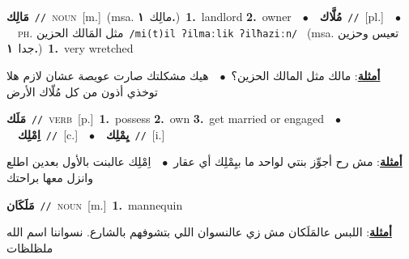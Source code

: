 \documentclass[10pt,a4paper,twoside]{article} %
\begin{document}
\begin{multicols}{2}
{\setlength\topsep{0pt}\textbf{\foreignlanguage{arabic}{مَالِك}}\ {\color{gray}\texttt{//}\color{black}}\ \textsc{noun}\ [m.]\ \color{gray}(msa. \foreignlanguage{arabic}{مالِك}~\foreignlanguage{arabic}{\textbf{١.}})\color{black}\ \textbf{1.}~landlord  \textbf{2.}~owner\ \ $\bullet$\ \ \setlength\topsep{0pt}\textbf{\foreignlanguage{arabic}{مُلَّاك}}\ {\color{gray}\texttt{//}\color{black}}\ [pl.]\ \ $\bullet$\ \ \textsc{ph.} \color{gray} \foreignlanguage{arabic}{مثل المَالك الحزين}\color{black}\ {\color{gray}\texttt{/{\sffamily mi(t)il ʔilmaːlik ʔilħaziːn}/}\color{black}}\ \color{gray} (msa. \foreignlanguage{arabic}{تعيس وحزين جدا}~\foreignlanguage{arabic}{\textbf{١.}})\color{black}\ \textbf{1.}~very wretched\  \begin{flushright}\color{gray}\foreignlanguage{arabic}{\textbf{\underline{\foreignlanguage{arabic}{أمثلة}}}: مالك مثل المالك الحزين؟\ $\bullet$\ \  هيك مشكلتك صارت عويصة عشان لازم هلا توخذي أذون من كل مُلّاك الأرض}\end{flushright}\color{black}} \vspace{2mm}

{\setlength\topsep{0pt}\textbf{\foreignlanguage{arabic}{مَلَك}}\ {\color{gray}\texttt{//}\color{black}}\ \textsc{verb}\ [p.]\ \textbf{1.}~possess  \textbf{2.}~own  \textbf{3.}~get married or engaged\ \ $\bullet$\ \ \setlength\topsep{0pt}\textbf{\foreignlanguage{arabic}{اِمْلِك}}\ {\color{gray}\texttt{//}\color{black}}\ [c.]\ \ $\bullet$\ \ \setlength\topsep{0pt}\textbf{\foreignlanguage{arabic}{يِمْلِك}}\ {\color{gray}\texttt{//}\color{black}}\ [i.]\  \begin{flushright}\color{gray}\foreignlanguage{arabic}{\textbf{\underline{\foreignlanguage{arabic}{أمثلة}}}: مش رح أجوِّز بنتي لواحد ما بيِمْلِك أي عقار\ $\bullet$\ \  اِمْلِك عالبنت بالأول بعدين اطلع وانزل معها براحتك}\end{flushright}\color{black}} \vspace{2mm}

{\setlength\topsep{0pt}\textbf{\foreignlanguage{arabic}{مَلَكَان}}\ {\color{gray}\texttt{//}\color{black}}\ \textsc{noun}\ [m.]\ \textbf{1.}~mannequin\  \begin{flushright}\color{gray}\foreignlanguage{arabic}{\textbf{\underline{\foreignlanguage{arabic}{أمثلة}}}: اللبس عالمَلَكان مش زي عالنسوان اللي بتشوفهم بالشارع. نسواننا اسم الله ملظلظات}\end{flushright}\color{black}} \vspace{2mm}


\end{multicols}
\end{document}
